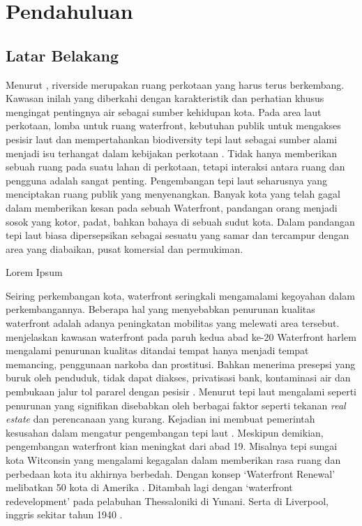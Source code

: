 \documentclass[../projects/thesis.tex]{subfiles}
\begin{document}
\chapter{Pendahuluan}\label{chap:pendahuluan}

\section{Latar Belakang}

Menurut \cite{shamsuddin2013}, riverside merupakan ruang perkotaan yang harus terus berkembang. Kawasan inilah yang diberkahi dengan karakteristik dan perhatian khusus mengingat pentingnya air sebagai sumber kehidupan kota.
Pada area laut perkotaan, lomba untuk ruang waterfront, kebutuhan publik untuk mengakses pesisir laut dan mempertahankan biodiversity tepi laut sebagai sumber alami menjadi isu terhangat dalam kebijakan perkotaan \citep{breen1994waterfronts}.
Tidak hanya memberikan sebuah ruang pada suatu lahan di perkotaan, tetapi interaksi antara ruang dan pengguna adalah sangat penting. Pengembangan tepi laut seharusnya yang menciptakan ruang publik yang menyenangkan. Banyak kota yang telah gagal dalam memberikan kesan pada sebuah Waterfront, pandangan orang menjadi sosok yang kotor, padat, bahkan bahaya di sebuah sudut kota. Dalam pandangan \cite{goodwin1999} tepi laut biasa dipersepsikan sebagai sesuatu yang samar dan tercampur dengan area yang diabaikan, pusat komersial dan permukiman.

Lorem Ipsum \cite{goodwin1999}


Seiring perkembangan kota, waterfront seringkali mengamalami kegoyahan dalam perkembangannya. Beberapa hal yang menyebabkan penurunan kualitas  waterfront adalah adanya peningkatan mobilitas yang melewati area tersebut\citep{richarda.lehmann1966}. \cite{ulam2009} menjelaskan kawasan waterfront pada paruh kedua abad ke-20 Waterfront harlem mengalami penurunan kualitas ditandai tempat hanya menjadi tempat memancing, penggunaan narkoba dan prostitusi. Bahkan menerima presepsi yang buruk oleh penduduk, tidak dapat diakses, privatisasi bank, kontaminasi air dan pembukaan jalur tol pararel dengan pesisir \citep{shamsuddin2013}. Menurut \cite{benages2015revisiting} tepi laut mengalami seperti penurunan yang signifikan disebabkan oleh berbagai faktor seperti tekanan \textit{real estate} dan perencanaan yang kurang. Kejadian ini membuat pemerintah kesusahan dalam mengatur pengembangan tepi laut \citep{gripaios1999ports}.
Meskipun demikian, pengembangan waterfront kian meningkat dari abad 19. Misalnya tepi sungai kota Witconsin yang mengalami kegagalan dalam memberikan rasa ruang dan perbedaan kota itu akhirnya berbedah. Dengan konsep `Waterfront Renewal' melibatkan 50 kota di Amerika \citep{richarda.lehmann1966}. Ditambah lagi dengan `waterfront redevelopment' pada pelabuhan Thessaloniki di Yunani. Serta di Liverpool, inggris sekitar tahun 1940 \citep{couch2003city}.
\end{document}
